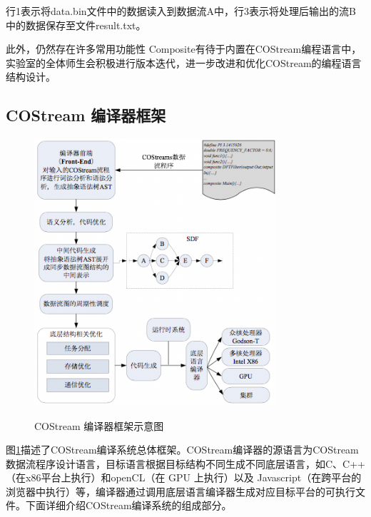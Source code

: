 行1表示将data.bin文件中的数据读入到数据流A中，行3表示将处理后输出的流B中的数据保存至文件result.txt。

此外，仍然存在许多常用功能性 Composite有待于内置在COStream编程语言中， 实验室的全体师生会积极进行版本迭代，进一步改进和优化COStream的编程语言结构设计。 

\subsection{COStream 编译器框架}

\begin{figure}[htbp]
  \centering
  \includegraphics[width=0.8\textwidth]{Img/Chap_Application/Yu/compiler.png}\\
  \caption{COStream 编译器框架示意图}\label{fig:compiler}
\end{figure}

图\ref{fig:compiler}描述了COStream编译系统总体框架。COStream编译器的源语言为COStream数据流程序设计语言，目标语言根据目标结构不同生成不同底层语言，如C、C++（在x86平台上执行）和openCL（在 GPU 上执行）以及 Javascript（在跨平台的浏览器中执行）等，编译器通过调用底层语言编译器生成对应目标平台的可执行文件。下面详细介绍COStream编译系统的组成部分。

